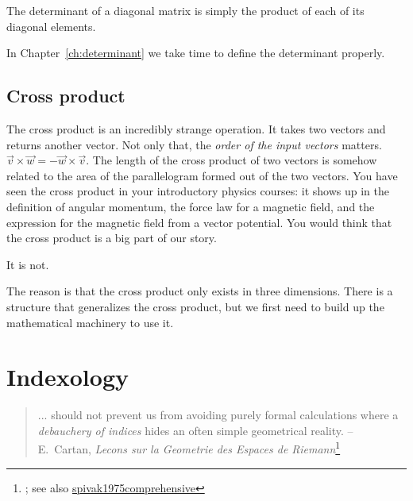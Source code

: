 \documentclass[12pt, oneside]{report}    %
\let\oldsection\section
\def\section{%
  \setcounter{sidenote}{1}%
  \oldsection
}
\begin{document}
\begin{subappendices}
\begin{example}\label{eg:determinant:of:diagonal}
The determinant of a diagonal matrix is simply the product of each of its diagonal elements. 
\end{example}

In Chapter~\ref{ch:determinant} we take time to define the determinant properly. 

\section{Cross product}

The cross product is an incredibly strange operation. It takes two vectors and returns another vector. Not only that, the \emph{order of the input vectors} matters. $\vec{v}\times\vec{w} = -\vec{w}\times\vec{v}$. The length of the cross product of two vectors is somehow related to the area of the parallelogram formed out of the two vectors. You have seen the cross product in your introductory physics courses: it shows up in the definition of angular momentum, the force law for a magnetic field, and the expression for the magnetic field from a vector potential. You would think that the cross product is a big part of our story. 

It is not.

The reason is that the cross product only exists in three dimensions. There is a structure that generalizes the cross product, but we first need to build up the mathematical machinery to use it. 



\end{subappendices}



\chapter{Indexology}\label{ch:indexology}
\begin{quote}
... should not prevent us from avoiding purely formal calculations where a \emph{debauchery of indices} hides an often simple geometrical reality. -- E.~Cartan, \emph{Lecons sur la Geometrie des Espaces de Riemann}\footnote{\cite{spivak1975comprehensive}; see also \url{spivak1975comprehensive}}
\end{quote} %
\end{document}
